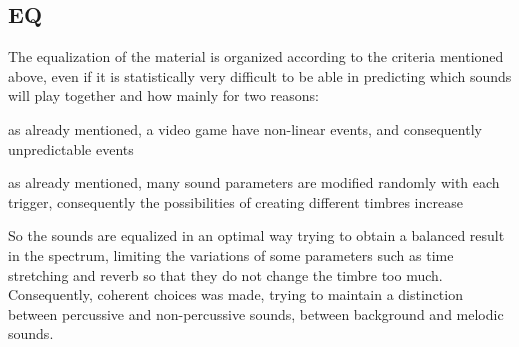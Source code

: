	\subsection{EQ}
	The equalization of the material is organized according to the criteria mentioned above, even if it is statistically very difficult to be able in predicting which sounds will play together and how mainly for two reasons:

	\begin{compactitem}
		\item as already mentioned, a video game have non-linear events, and consequently unpredictable events
		\item as already mentioned, many sound parameters are modified randomly with each trigger, consequently the possibilities of creating different timbres increase
	\end{compactitem}

	So the sounds are equalized in an optimal way trying to obtain a balanced result in the spectrum, limiting the variations of some parameters such as time stretching and reverb so that they do not change the timbre too much. Consequently, coherent choices was made, trying to maintain a distinction between percussive and non-percussive sounds, between background and melodic sounds.


